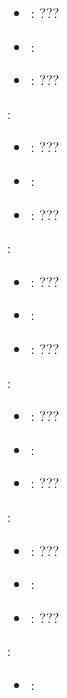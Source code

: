 \begin{itemize}
{\begin{itemize}
                \item \optionPossibleValues{}: ???
                \item \optionDefaultValue{}: 
                \item \optionDescrption{}: ???
           \end{itemize}
    \item {}:
           \begin{itemize}
                \item \optionPossibleValues{}: ???
                \item \optionDefaultValue{}: 
                \item \optionDescrption{}: ???
           \end{itemize}
    \item {}:
           \begin{itemize}
                \item \optionPossibleValues{}: ???
                \item \optionDefaultValue{}: 
                \item \optionDescrption{}: ???
           \end{itemize}
    \item {}:
           \begin{itemize}
                \item \optionPossibleValues{}: ???
                \item \optionDefaultValue{}: 
                \item \optionDescrption{}: ???
           \end{itemize}
    \item {}:
           \begin{itemize}
                \item \optionPossibleValues{}: ???
                \item \optionDefaultValue{}: 
                \item \optionDescrption{}: ???
           \end{itemize}
    }
    \item {}:
           \begin{itemize}
                \item \optionPossibleValues{}: 

\end{itemize}
\end{itemize}
